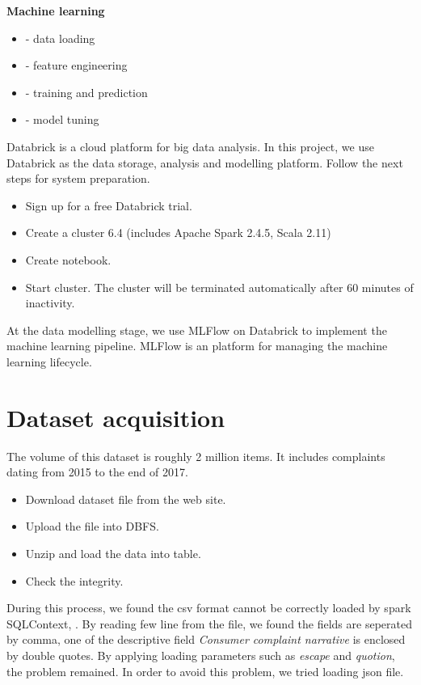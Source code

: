 \documentclass[conference]{IEEEtran}
\begin{document}
\textbf{Machine learning
}\begin{itemize}
\item  - data loading
\item - feature engineering
\item - training and prediction
\item - model tuning 
\end{itemize}







Databrick is a cloud platform for big data analysis. In this project, we use Databrick as the data storage, analysis and modelling platform.
Follow the next steps for system preparation.
\begin{itemize}

\item Sign up for a free Databrick trial.
\item Create a cluster 6.4 (includes Apache Spark 2.4.5, Scala 2.11) 
\item Create notebook.
\item Start cluster.
The cluster will be terminated automatically after 60 minutes of inactivity.
\end{itemize}

At the data modelling stage, we use MLFlow on Databrick to implement the machine learning pipeline. MLFlow is an platform for managing the machine learning lifecycle.  


\section{Dataset acquisition}

The volume of this dataset is roughly 2 million items. It includes complaints dating from 2015 to the end of 2017. 

\begin{itemize}
\item Download dataset file from the web site.
\item Upload the file into DBFS. 
\item Unzip and load the data into table.
\item Check the integrity.
\end{itemize}
During this process, we found the csv format cannot be correctly loaded by spark SQLContext, . By reading few line from the file, we found the fields are seperated by comma, one of the descriptive field \emph{Consumer complaint narrative} is enclosed by double quotes. By applying loading parameters such as \emph{escape} and \emph{quotion}, the problem remained.
In order to avoid this problem, we tried loading json file.
\end{document}
